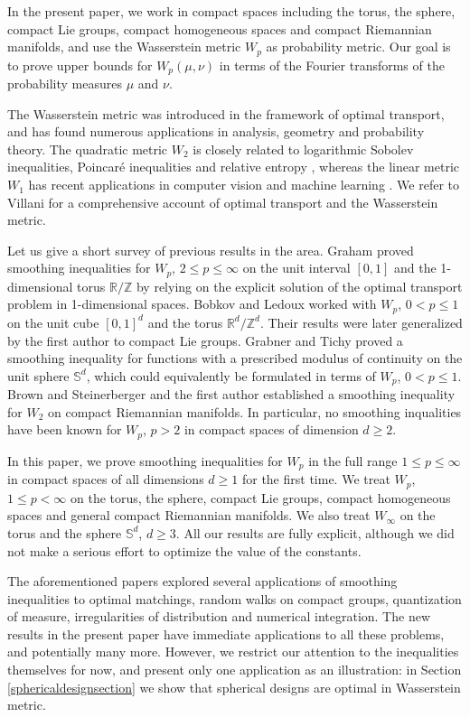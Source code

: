 \documentclass[11pt,a4paper]{article}
\theoremstyle{definition}
\begin{document}
In the present paper, we work in compact spaces including the torus, the sphere, compact Lie groups, compact homogeneous spaces and compact Riemannian manifolds, and use the Wasserstein metric $W_p$ as probability metric. Our goal is to prove upper bounds for $W_p (\mu, \nu)$ in terms of the Fourier transforms of the probability measures $\mu$ and $\nu$.

The Wasserstein metric was introduced in the framework of optimal transport, and has found numerous applications in analysis, geometry and probability theory. The quadratic metric $W_2$ is closely related to logarithmic Sobolev inequalities, Poincar\'e inequalities and relative entropy \cite{OV}, whereas the linear metric $W_1$ has recent applications in computer vision and machine learning \cite{ACB}. We refer to Villani \cite{VI} for a comprehensive account of optimal transport and the Wasserstein metric.

Let us give a short survey of previous results in the area. Graham \cite{GR} proved smoothing inequalities for $W_p$, $2 \le p \le \infty$ on the unit interval $[0,1]$ and the 1-dimensional torus $\mathbb{R} / \mathbb{Z}$ by relying on the explicit solution of the optimal transport problem in 1-dimensional spaces. Bobkov and Ledoux \cite{BL1,BL2} worked with $W_p$, $0 < p \le 1$ on the unit cube $[0,1]^d$ and the torus $\mathbb{R}^d / \mathbb{Z}^d$. Their results were later generalized by the first author \cite{BOR1} to compact Lie groups. Grabner and Tichy \cite{GT} proved a smoothing inequality for functions with a prescribed modulus of continuity on the unit sphere $\mathbb{S}^d$, which could equivalently be formulated in terms of $W_p$, $0<p\le 1$. Brown and Steinerberger \cite{BS} and the first author \cite{BOR2} established a smoothing inequality for $W_2$ on compact Riemannian manifolds. In particular, no smoothing inqualities have been known for $W_p$, $p>2$ in compact spaces of dimension $d \ge 2$.

In this paper, we prove smoothing inequalities for $W_p$ in the full range $1 \le p \le \infty$ in compact spaces of all dimensions $d \ge 1$ for the first time. We treat $W_p$, $1 \le p < \infty$ on the torus, the sphere, compact Lie groups, compact homogeneous spaces and general compact Riemannian manifolds. We also treat $W_{\infty}$ on the torus and the sphere $\mathbb{S}^d$, $d \ge 3$. All our results are fully explicit, although we did not make a serious effort to optimize the value of the constants.

The aforementioned papers explored several applications of smoothing inequalities to optimal matchings, random walks on compact groups, quantization of measure, irregularities of distribution and numerical integration. The new results in the present paper have immediate applications to all these problems, and potentially many more. However, we restrict our attention to the inequalities themselves for now, and present only one application as an illustration: in Section \ref{sphericaldesignsection} we show that spherical designs are optimal in Wasserstein metric.
\end{document}
